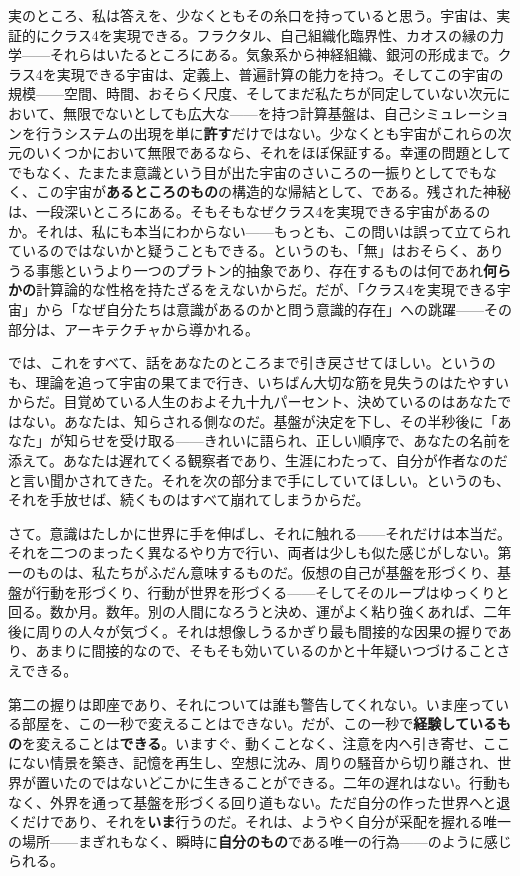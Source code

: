 \documentclass[11pt, twoside, openright]{book}
\begin{document}
実のところ、私は答えを、少なくともその糸口を持っていると思う。宇宙は、実証的にクラス4を実現できる。フラクタル、自己組織化臨界性、カオスの縁の力学------それらはいたるところにある。気象系から神経組織、銀河の形成まで。クラス4を実現できる宇宙は、定義上、普遍計算の能力を持つ。そしてこの宇宙の規模------空間、時間、おそらく尺度、そしてまだ私たちが同定していない次元において、無限でないとしても広大な------を持つ計算基盤は、自己シミュレーションを行うシステムの出現を単に\textbf{許す}だけではない。少なくとも宇宙がこれらの次元のいくつかにおいて無限であるなら、それをほぼ保証する。幸運の問題としてでもなく、たまたま意識という目が出た宇宙のさいころの一振りとしてでもなく、この宇宙が\textbf{あるところのもの}の構造的な帰結として、である。残された神秘は、一段深いところにある。そもそもなぜクラス4を実現できる宇宙があるのか。それは、私にも本当にわからない------もっとも、この問いは誤って立てられているのではないかと疑うこともできる。というのも、「無」はおそらく、ありうる事態というより一つのプラトン的抽象であり、存在するものは何であれ\textbf{何らかの}計算論的な性格を持たざるをえないからだ。だが、「クラス4を実現できる宇宙」から「なぜ自分たちは意識があるのかと問う意識的存在」への跳躍------その部分は、アーキテクチャから導かれる。

では、これをすべて、話をあなたのところまで引き戻させてほしい。というのも、理論を追って宇宙の果てまで行き、いちばん大切な筋を見失うのはたやすいからだ。目覚めている人生のおよそ九十九パーセント、決めているのはあなたではない。あなたは、知らされる側なのだ。基盤が決定を下し、その半秒後に「あなた」が知らせを受け取る------きれいに語られ、正しい順序で、あなたの名前を添えて。あなたは遅れてくる観察者であり、生涯にわたって、自分が作者なのだと言い聞かされてきた。それを次の部分まで手にしていてほしい。というのも、それを手放せば、続くものはすべて崩れてしまうからだ。

さて。意識はたしかに世界に手を伸ばし、それに触れる------それだけは本当だ。それを二つのまったく異なるやり方で行い、両者は少しも似た感じがしない。第一のものは、私たちがふだん意味するものだ。仮想の自己が基盤を形づくり、基盤が行動を形づくり、行動が世界を形づくる------そしてそのループはゆっくりと回る。数か月。数年。別の人間になろうと決め、運がよく粘り強くあれば、二年後に周りの人々が気づく。それは想像しうるかぎり最も間接的な因果の握りであり、あまりに間接的なので、そもそも効いているのかと十年疑いつづけることさえできる。

第二の握りは即座であり、それについては誰も警告してくれない。いま座っている部屋を、この一秒で変えることはできない。だが、この一秒で\textbf{経験しているもの}を変えることは\textbf{できる}。いますぐ、動くことなく、注意を内へ引き寄せ、ここにない情景を築き、記憶を再生し、空想に沈み、周りの騒音から切り離され、世界が置いたのではないどこかに生きることができる。二年の遅れはない。行動もなく、外界を通って基盤を形づくる回り道もない。ただ自分の作った世界へと退くだけであり、それを\textbf{いま}行うのだ。それは、ようやく自分が采配を握れる唯一の場所------まぎれもなく、瞬時に\textbf{自分のもの}である唯一の行為------のように感じられる。
\end{document}
